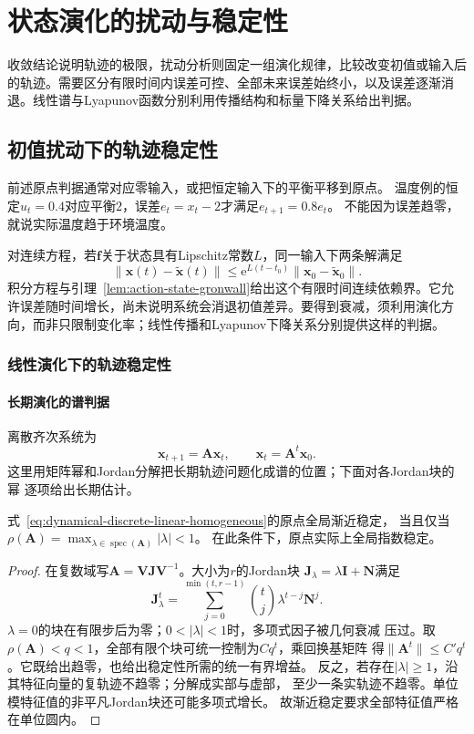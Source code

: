 \section{状态演化的扰动与稳定性}
\label{sec:dynamical-stability-sensitivity}
收敛结论说明轨迹的极限，扰动分析则固定一组演化规律，比较改变初值或输入后的轨迹。需要区分有限时间内误差可控、全部未来误差始终小，以及误差逐渐消退。线性谱与Lyapunov函数分别利用传播结构和标量下降关系给出判据。

\subsection{初值扰动下的轨迹稳定性}
前述原点判据通常对应零输入，或把恒定输入下的平衡平移到原点。
温度例的恒定$u_t=0.4$对应平衡$2$，误差$e_t=x_t-2$才满足$e_{t+1}=0.8e_t$。
不能因为误差趋零，就说实际温度趋于环境温度。

对连续方程，若$\bm f$关于状态具有Lipschitz常数$L$，同一输入下两条解满足
\[
  \|\bm x(t)-\widetilde{\bm x}(t)\|
  \leq \mathrm e^{L(t-t_0)}\|\bm x_0-\widetilde{\bm x}_0\|.
\]
积分方程与引理~\ref{lem:action-state-gronwall}给出这个有限时间连续依赖界。它允许误差随时间增长，尚未说明系统会消退初值差异。要得到衰减，须利用演化方向，而非只限制变化率；线性传播和Lyapunov下降关系分别提供这样的判据。

\subsubsection{线性演化下的轨迹稳定性}
\paragraph{长期演化的谱判据}

离散齐次系统为
\begin{equation}
  \bm x_{t+1}=\bm A\bm x_t,\qquad \bm x_t=\bm A^t\bm x_0.
  \label{eq:dynamical-discrete-linear-homogeneous}
\end{equation}
这里用矩阵幂和Jordan分解把长期轨迹问题化成谱的位置；下面对各Jordan块的幂
逐项给出长期估计。
\begin{theorem}[离散线性系统的渐近稳定性]
  \label{thm:dynamical-discrete-spectral-stability}
  式~\eqref{eq:dynamical-discrete-linear-homogeneous}的原点全局渐近稳定，
  当且仅当$\rho(\bm A)=\max_{\lambda\in\operatorname{spec}(\bm A)}|\lambda|<1$。
  在此条件下，原点实际上全局指数稳定。
\end{theorem}
\begin{proof}
  在复数域写$\bm A=\bm V\bm J\bm V^{-1}$。大小为$r$的Jordan块
  $\bm J_\lambda=\lambda\bm I+\bm N$满足
  \[
    \bm J_\lambda^t
      =\sum_{j=0}^{\min(t,r-1)}\binom tj\lambda^{t-j}\bm N^j.
  \]
  $\lambda=0$的块在有限步后为零；$0<|\lambda|<1$时，多项式因子被几何衰减
  压过。取$\rho(\bm A)<q<1$，全部有限个块可统一控制为$Cq^t$，乘回换基矩阵
  得$\|\bm A^t\|\leq C' q^t$。它既给出趋零，也给出稳定性所需的统一有界增益。
  反之，若存在$|\lambda|\geq1$，沿其特征向量的复轨迹不趋零；分解成实部与虚部，
  至少一条实轨迹不趋零。单位模特征值的非平凡Jordan块还可能多项式增长。
  故渐近稳定要求全部特征值严格在单位圆内。
\end{proof}

